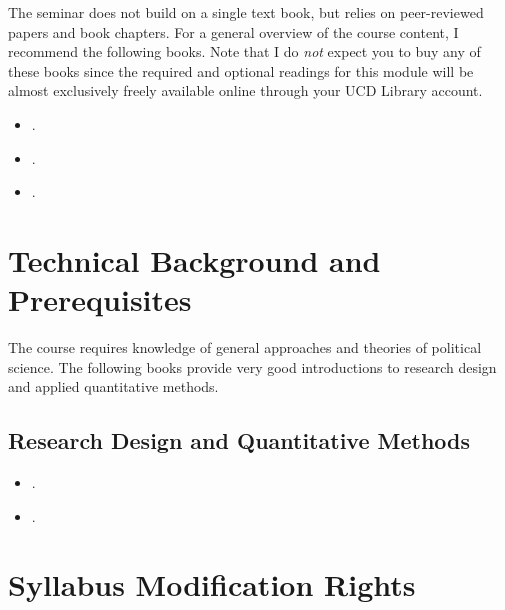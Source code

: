 \documentclass[abstract=on,parskip=full,headings=standardclasses,fontsize=11pt,paper=a4]{scrartcl}
\begin{document}
The seminar does not build on a single text book, but relies  on peer-reviewed papers and book chapters. For  a general overview of the course content, I recommend the following books. Note that I do \textit{not} expect you to buy any of these books since the required and optional readings  for this module will be almost exclusively freely available online through your UCD Library account.

\begin{itemize}
\item {}.
\item {}.
\item {}.
\end{itemize}




\section*{Technical Background and Prerequisites}

The course requires knowledge of general approaches and theories of political science. The following books provide very good introductions to research design and applied quantitative methods.

\subsection*{Research Design and Quantitative Methods}
\begin{itemize}
\item {}.
\item {}. %
\end{itemize}


\section*{Syllabus Modification Rights}
\end{document}
